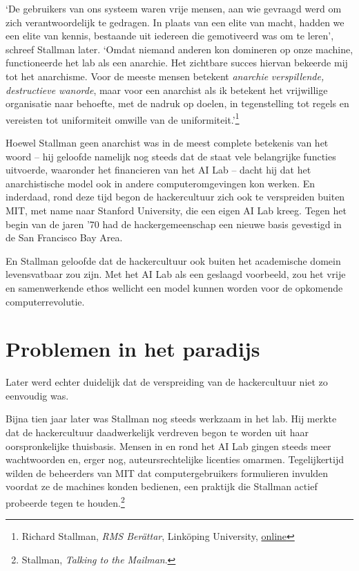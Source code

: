\documentclass[
  a5paper,
  smalldemyvopaper,11pt,twoside,onecolumn,openright,extrafontsizes,
hidelinks]{memoir}
\begin{document}
`De gebruikers van ons systeem waren vrije mensen, aan wie gevraagd werd
om zich verantwoordelijk te gedragen. In plaats van een elite van macht,
hadden we een elite van kennis, bestaande uit iedereen die gemotiveerd
was om te leren', schreef Stallman later. `Omdat niemand anderen kon
domineren op onze machine, functioneerde het lab als een anarchie. Het
zichtbare succes hiervan bekeerde mij tot het anarchisme. Voor de meeste
mensen betekent \emph{anarchie} \emph{verspillende, destructieve
wanorde}, maar voor een anarchist als ik betekent het vrijwillige
organisatie naar behoefte, met de nadruk op doelen, in tegenstelling tot
regels en vereisten tot uniformiteit omwille van de
uniformiteit.'\footnote{\hspace{0pt}Richard Stallman, \emph{RMS
  Berättar}, Linköping University,
  \href{http://www.lysator.liu.se/history/garb/txt/87-2-rms.txt.}{online}}

Hoewel Stallman geen anarchist was in de meest complete betekenis van
het woord -- hij geloofde namelijk nog steeds dat de staat vele
belangrijke functies uitvoerde, waaronder het financieren van het AI Lab
-- dacht hij dat het anarchistische model ook in andere
computeromgevingen kon werken. En inderdaad, rond deze tijd begon de
hackercultuur zich ook te verspreiden buiten MIT, met name naar Stanford
University, die een eigen AI Lab kreeg. Tegen het begin van de jaren '70
had de hackergemeenschap een nieuwe basis gevestigd in de San Francisco
Bay Area.

En Stallman geloofde dat de hackercultuur ook buiten het academische
domein levensvatbaar zou zijn. Met het AI Lab als een geslaagd
voorbeeld, zou het vrije en samenwerkende ethos wellicht een model
kunnen worden voor de opkomende computerrevolutie.

\section{Problemen in het paradijs}\label{problemen-in-het-paradijs}

Later werd echter duidelijk dat de verspreiding van de hackercultuur
niet zo eenvoudig was.

Bijna tien jaar later was Stallman nog steeds werkzaam in het lab. Hij
merkte dat de hackercultuur daadwerkelijk verdreven begon te worden uit
haar oorspronkelijke thuisbasis. Mensen in en rond het AI Lab gingen
steeds meer wachtwoorden en, erger nog, auteursrechtelijke licenties
omarmen. Tegelijkertijd wilden de beheerders van MIT dat
computergebruikers formulieren invulden voordat ze de machines konden
bedienen, een praktijk die Stallman actief probeerde tegen te
houden.\footnote{\hspace{0pt}Stallman, \emph{Talking to the Mailman}.}
\end{document}
